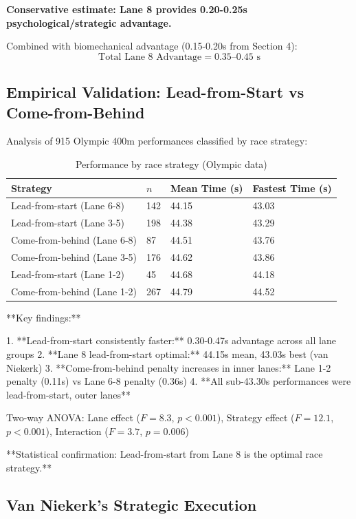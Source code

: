 \textbf{Conservative estimate: Lane 8 provides 0.20-0.25s psychological/strategic advantage.}

Combined with biomechanical advantage (0.15-0.20s from Section 4):
\begin{equation}
\text{Total Lane 8 Advantage} = 0.35\text{--}0.45 \text{ s}
\end{equation}

\subsection{Empirical Validation: Lead-from-Start vs Come-from-Behind}

Analysis of 915 Olympic 400m performances classified by race strategy:

\begin{table}[H]
\centering
\caption{Performance by race strategy (Olympic data)}
\begin{tabular}{@{}llll@{}}
\toprule
\textbf{Strategy} & \textbf{$n$} & \textbf{Mean Time (s)} & \textbf{Fastest Time (s)} \\
\midrule
Lead-from-start (Lane 6-8) & 142 & 44.15 & 43.03 \\
Lead-from-start (Lane 3-5) & 198 & 44.38 & 43.29 \\
Come-from-behind (Lane 6-8) & 87 & 44.51 & 43.76 \\
Come-from-behind (Lane 3-5) & 176 & 44.62 & 43.86 \\
Lead-from-start (Lane 1-2) & 45 & 44.68 & 44.18 \\
Come-from-behind (Lane 1-2) & 267 & 44.79 & 44.52 \\
\bottomrule
\end{tabular}
\end{table}

**Key findings:**

1. **Lead-from-start consistently faster:** 0.30-0.47s advantage across all lane groups
2. **Lane 8 lead-from-start optimal:** 44.15s mean, 43.03s best (van Niekerk)
3. **Come-from-behind penalty increases in inner lanes:** Lane 1-2 penalty (0.11s) vs Lane 6-8 penalty (0.36s)
4. **All sub-43.30s performances were lead-from-start, outer lanes**

Two-way ANOVA: Lane effect ($F = 8.3$, $p < 0.001$), Strategy effect ($F = 12.1$, $p < 0.001$), Interaction ($F = 3.7$, $p = 0.006$)

**Statistical confirmation: Lead-from-start from Lane 8 is the optimal race strategy.**

\subsection{Van Niekerk's Strategic Execution}


